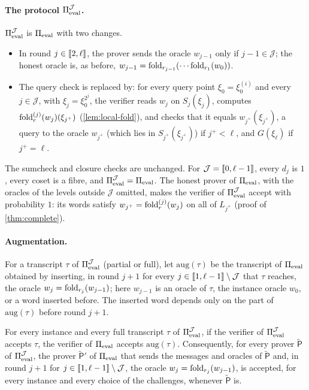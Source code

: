 \paragraph{The protocol $\Pi_{\mathrm{eval}}^{\mathcal{J}}$.}
$\Pi_{\mathrm{eval}}^{\mathcal{J}}$ is $\Pi_{\mathrm{eval}}$ with two changes.
\begin{itemize}
  \item In round $j \in \llbracket 2, \ell \rrbracket$, the prover sends the oracle $w_{j-1}$ only if $j - 1 \in \mathcal{J}$; the honest oracle is, as before, $w_{j-1} = \mathrm{fold}_{r_{j-1}}(\cdots\mathrm{fold}_{r_1}(w_0))$.
  \item The query check is replaced by: for every query point $\xi_0 = \xi^{(i)}_0$ and every $j \in \mathcal{J}$, with $\xi_j = \xi_0^{2^j}$, the verifier reads $w_j$ on $S_j(\xi_j)$, computes $\mathrm{fold}^{(j)}_r(w_j)(\xi_{j^+})$ (\cref{lem:local-fold}), and checks that it equals $w_{j^+}(\xi_{j^+})$, a query to the oracle $w_{j^+}$ (which lies in $S_{j^+}(\xi_{j^+})$) if $j^+ < \ell$, and $G(\xi_\ell)$ if $j^+ = \ell$.
\end{itemize}
The sumcheck and closure checks are unchanged. For $\mathcal{J} = \llbracket 0, \ell-1 \rrbracket$, every $d_j$ is $1$, every coset is a fibre, and $\Pi_{\mathrm{eval}}^{\mathcal{J}} = \Pi_{\mathrm{eval}}$.
The honest prover of $\Pi_{\mathrm{eval}}$, with the oracles of the levels outside $\mathcal{J}$ omitted, makes the verifier of $\Pi_{\mathrm{eval}}^{\mathcal{J}}$ accept with probability $1$: its words satisfy $w_{j^+} = \mathrm{fold}^{(j)}_r(w_j)$ on all of $L_{j^+}$ (proof of \cref{thm:complete}).

\paragraph{Augmentation.}
For a transcript $\tau$ of $\Pi_{\mathrm{eval}}^{\mathcal{J}}$ (partial or full), let $\mathrm{aug}(\tau)$ be the transcript of $\Pi_{\mathrm{eval}}$ obtained by inserting, in round $j+1$ for every $j \in \llbracket 1, \ell-1 \rrbracket \setminus \mathcal{J}$ that $\tau$ reaches, the oracle $w_j = \mathrm{fold}_{r_j}(w_{j-1})$; here $w_{j-1}$ is an oracle of $\tau$, the instance oracle $w_0$, or a word inserted before.
The inserted word depends only on the part of $\mathrm{aug}(\tau)$ before round $j+1$.

\begin{lemma}\label{lem:skip}
For every instance and every full transcript $\tau$ of $\Pi_{\mathrm{eval}}^{\mathcal{J}}$, if the verifier of $\Pi_{\mathrm{eval}}^{\mathcal{J}}$ accepts $\tau$, the verifier of $\Pi_{\mathrm{eval}}$ accepts $\mathrm{aug}(\tau)$.
Consequently, for every prover $\tilde{\mathsf{P}}$ of $\Pi_{\mathrm{eval}}^{\mathcal{J}}$, the prover $\tilde{\mathsf{P}}'$ of $\Pi_{\mathrm{eval}}$ that sends the messages and oracles of $\tilde{\mathsf{P}}$ and, in round $j+1$ for $j \in \llbracket 1, \ell-1 \rrbracket \setminus \mathcal{J}$, the oracle $w_j = \mathrm{fold}_{r_j}(w_{j-1})$, is accepted, for every instance and every choice of the challenges, whenever $\tilde{\mathsf{P}}$ is.
\end{lemma}

